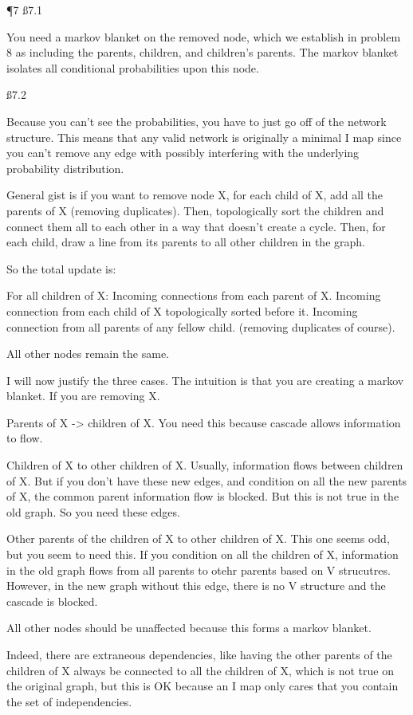 \P 7
\ss{7.1}

You need a markov blanket on the removed node, which we establish in problem 8 as including the parents, children, and children's parents. The markov blanket isolates all conditional probabilities upon this node.

\ss{7.2}

Because you can't see the probabilities, you have to just go off of the network structure. This means that any valid network is originally a minimal I map since you can't remove any edge with possibly interfering with the underlying probability distribution.

General gist is if you want to remove node X, for each child of X, add all the parents of X (removing duplicates). Then, topologically sort the children and connect them all to each other in a way that doesn't create a cycle. Then, for each child, draw a line from its parents to all other children in the graph.

So the total update is:

For all children of X: Incoming connections from each parent of X. Incoming connection from each child of X topologically sorted before it. Incoming connection from all parents of any fellow child. (removing duplicates of course).

All other nodes remain the same.

I will now justify the three cases. The intuition is that you are creating a markov blanket. If you are removing X.

Parents of X -> children of X. You need this because cascade allows information to flow.

Children of X to other children of X. Usually, information flows between children of X. But if you don't have these new edges, and condition on all the new parents of X, the common parent information flow is blocked. But this is not true in the old graph. So you need these edges.

Other parents of the children of X to other children of X. This one seems odd, but you seem to need this. If you condition on all the children of X, information in the old graph flows from all parents to otehr parents based on V strucutres. However, in the new graph without this edge, there is no V structure and the cascade is blocked.

All other nodes should be unaffected because this forms a markov blanket.

Indeed, there are extraneous dependencies, like having the other parents of the children of X always be connected to all the children of X, which is not true on the original graph, but this is OK because an I map only cares that you contain the set of independencies.

